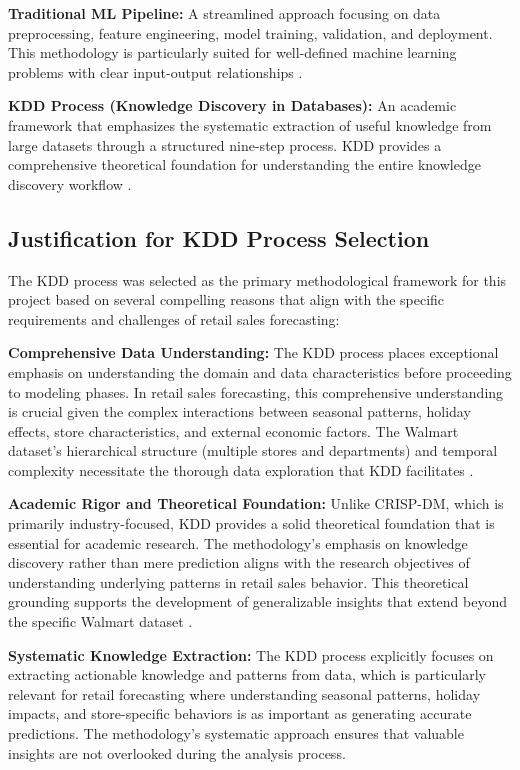\textbf{Traditional ML Pipeline:} A streamlined approach focusing on data preprocessing, feature engineering, model training, validation, and deployment. This methodology is particularly suited for well-defined machine learning problems with clear input-output relationships \cite{Sculley:2015}.

\textbf{KDD Process (Knowledge Discovery in Databases):} An academic framework that emphasizes the systematic extraction of useful knowledge from large datasets through a structured nine-step process. KDD provides a comprehensive theoretical foundation for understanding the entire knowledge discovery workflow \cite{Fayyad:1996}.

\subsection{Justification for KDD Process Selection}
\label{subsec:kdd_justification}

The KDD process was selected as the primary methodological framework for this project based on several compelling reasons that align with the specific requirements and challenges of retail sales forecasting:

\textbf{Comprehensive Data Understanding:} The KDD process places exceptional emphasis on understanding the domain and data characteristics before proceeding to modeling phases. In retail sales forecasting, this comprehensive understanding is crucial given the complex interactions between seasonal patterns, holiday effects, store characteristics, and external economic factors. The Walmart dataset's hierarchical structure (multiple stores and departments) and temporal complexity necessitate the thorough data exploration that KDD facilitates \cite{Fayyad:1996}.

\textbf{Academic Rigor and Theoretical Foundation:} Unlike CRISP-DM, which is primarily industry-focused, KDD provides a solid theoretical foundation that is essential for academic research. The methodology's emphasis on knowledge discovery rather than mere prediction aligns with the research objectives of understanding underlying patterns in retail sales behavior. This theoretical grounding supports the development of generalizable insights that extend beyond the specific Walmart dataset \cite{Piatetsky:1991}.

\textbf{Systematic Knowledge Extraction:} The KDD process explicitly focuses on extracting actionable knowledge and patterns from data, which is particularly relevant for retail forecasting where understanding seasonal patterns, holiday impacts, and store-specific behaviors is as important as generating accurate predictions. The methodology's systematic approach ensures that valuable insights are not overlooked during the analysis process.

